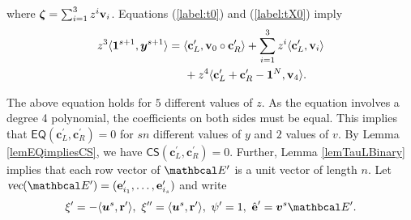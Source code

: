   where ${\boldsymbol{\zeta}} = \sum_{i=1}^{3} z^{i} \textbf{v}_i$. Equations (\ref{label:t0}) and (\ref{label:tX0}) imply
  \begin{align*}
      z^3 \langle \vecnb{1}^{s+1}, \vecnb{y}^{s+1} \rangle
      &= 
      \langle \textbf{c}_L^{\prime}, \textbf{v}_0 \circ \textbf{c}_R^{\prime} \rangle + 
      \sum_{i=1}^{3} z^i \langle \textbf{c}_L^{\prime}, \textbf{v}_i \rangle
      \\%
      & \hspace{0.5cm}
      + 
      z^4 \langle \textbf{c}_L^{\prime}+\textbf{c}_R^{\prime} - \vecnb{1}^{N}, \textbf{v}_4 \rangle.
  \end{align*}
  
  The above equation holds for $5$ different values of $z$. 
  As the equation involves a degree 4 polynomial, the coefficients on both sides must be equal. 
  This implies that $\textsf{EQ}(\textbf{c}_L^{\prime}, \textbf{c}_R^{\prime})=0$ for $sn$ different values of $y$ and $2$ values of $v$. 
  By Lemma \ref{lemEQimpliesCS}, we have $\textsf{CS}(\textbf{c}_L^{\prime}, \textbf{c}_R^{\prime})=0$. 
  Further, Lemma \ref{lemTauLBinary} implies that each row vector of $\Emat^{\prime}$ is a unit vector of length $n$.
  Let $\textsl{vec}(\Emat^{\prime}) = (\textbf{e}_{i_1}^{\prime}, \dots, \textbf{e}_{i_s}^{\prime})$ and write
  \begin{equation*}
      \xi^{\prime} = -\langle \vecnb{u}^s, \textbf{r}^{\prime} \rangle, \ \xi^{\prime \prime} = \langle \vecnb{u}^s, \textbf{r}^{\prime}\rangle, \
      \psi^{\prime} = 1, \
      \hat{\textbf{e}}^{\prime} = \vecnb{v}^{s}\Emat^{\prime}.
  \end{equation*}
  
